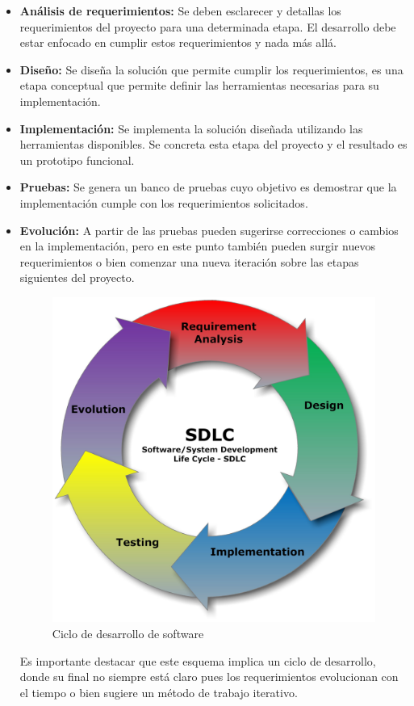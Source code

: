 \documentclass[11pt,letterpaper]{article}
\begin{document}
\begin{itemize}
	\item \textbf{Análisis de requerimientos:} Se deben esclarecer y detallas los requerimientos del proyecto para una determinada etapa. El desarrollo debe estar enfocado en cumplir estos requerimientos y nada más allá.
	
	\item \textbf{Diseño:} Se diseña la solución que permite cumplir los requerimientos, es una etapa conceptual que permite definir las herramientas necesarias para su implementación.
	
	\item \textbf{Implementación:} Se implementa la solución diseñada utilizando las herramientas disponibles. Se concreta esta etapa del proyecto y el resultado es un prototipo funcional.
	
	\item \textbf{Pruebas:} Se genera un banco de pruebas cuyo objetivo es demostrar que la implementación cumple con los requerimientos solicitados.
	
	\item \textbf{Evolución:} A partir de las pruebas pueden sugerirse correcciones o cambios en la implementación, pero en este punto también pueden surgir nuevos requerimientos o bien comenzar una nueva iteración sobre las etapas siguientes del proyecto.
	
\begin{figure}[!hb]
\centering
\includegraphics[scale = 0.1]{img/sdlc.jpg}
\caption{Ciclo de desarrollo de software} \label{metod}
\end{figure}

Es importante destacar que este esquema implica un ciclo de desarrollo, donde su final no siempre está claro pues los requerimientos evolucionan con el tiempo o bien sugiere un método de trabajo iterativo.
	
\end{itemize}
\end{document}
